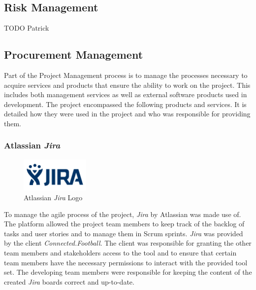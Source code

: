 
\subsection{Risk Management}
\label{ssec:risk_management}

TODO Patrick



\subsection{Procurement Management}
\label{ssec:procurement_management}

Part of the Project Management process is to manage the processes necessary to acquire services and products that ensure the ability to work on the project. This includes both management services as well as external software products used in development.
\newline
The project encompassed the following products and services. It is detailed how they were used in the project and who was responsible for providing them.

\subsubsection{Atlassian \textit{Jira}}
\label{sssec:jira}

\begin{figure}[H]
    \begin{center}
        \includegraphics[width=0.3\textwidth]{images/logos/jira-logo.png}
        \caption{Atlassian \textit{Jira} Logo}
        \label{fig:jira_logo}
    \end{center}
\end{figure}

To manage the agile process of the project, \textit{Jira} by Atlassian was made use of. The platform allowed the project team members to keep track of the backlog of tasks and user stories and to manage them in Scrum sprints.
\newline
\textit{Jira} was provided by the client \textit{Connected.Football}. The client was responsible for granting the other team members and stakeholders access to the tool and to ensure that certain team members have the necessary permissions to interact with the provided tool set. The developing team members were responsible for keeping the content of the created \textit{Jira} boards correct and up-to-date.

